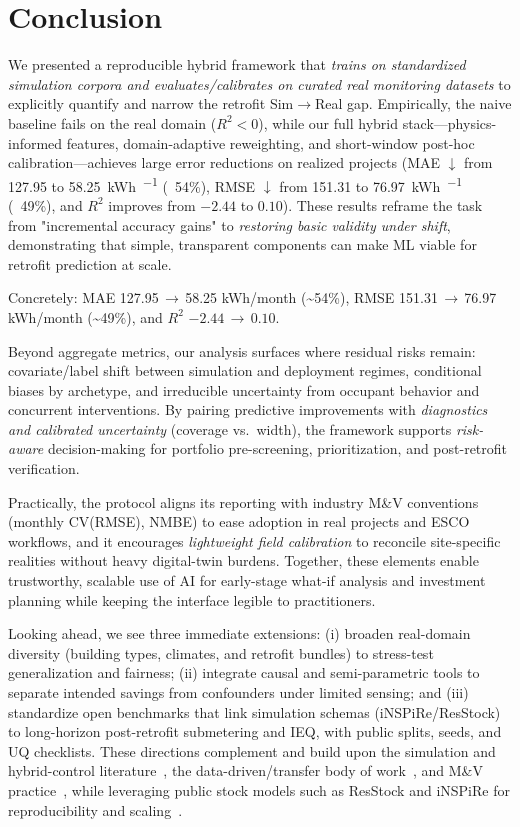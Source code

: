 ﻿\documentclass{article}
\begin{document}
\section{Conclusion}
We presented a reproducible hybrid framework that \emph{trains on standardized simulation corpora and evaluates/calibrates on curated real monitoring datasets} to explicitly quantify and narrow the retrofit Sim$\rightarrow$Real gap. Empirically, the naive baseline fails on the real domain ($R^2<0$), while our full hybrid stack---physics-informed features, domain-adaptive reweighting, and short-window post-hoc calibration---achieves large error reductions on realized projects (MAE $\downarrow$ from 127.95 to 58.25~\si{kWh\per\month} (~54\%), RMSE $\downarrow$ from 151.31 to 76.97~\si{kWh\per\month} (~49\%), and $R^2$ improves from $-2.44$ to $0.10$). These results reframe the task from "incremental accuracy gains" to \emph{restoring basic validity under shift}, demonstrating that simple, transparent components can make ML viable for retrofit prediction at scale.

Concretely: MAE 127.95\,$\rightarrow$\,58.25 kWh/month (\textasciitilde54\%), RMSE 151.31\,$\rightarrow$\,76.97 kWh/month (\textasciitilde49\%), and $R^2$ $-2.44\,\rightarrow\,0.10$.

Beyond aggregate metrics, our analysis surfaces where residual risks remain: covariate/label shift between simulation and deployment regimes, conditional biases by archetype, and irreducible uncertainty from occupant behavior and concurrent interventions. By pairing predictive improvements with \emph{diagnostics and calibrated uncertainty} (coverage vs.\ width), the framework supports \emph{risk-aware} decision-making for portfolio pre-screening, prioritization, and post-retrofit verification.

Practically, the protocol aligns its reporting with industry M\&V conventions (monthly CV(RMSE), NMBE) to ease adoption in real projects and ESCO workflows, and it encourages \emph{lightweight field calibration} to reconcile site-specific realities without heavy digital-twin burdens. Together, these elements enable trustworthy, scalable use of AI for early-stage what-if analysis and investment planning while keeping the interface legible to practitioners.

Looking ahead, we see three immediate extensions: (i) broaden real-domain diversity (building types, climates, and retrofit bundles) to stress-test generalization and fairness; (ii) integrate causal and semi-parametric tools to separate intended savings from confounders under limited sensing; and (iii) standardize open benchmarks that link simulation schemas (iNSPiRe/ResStock) to long-horizon post-retrofit submetering and IEQ, with public splits, seeds, and UQ checklists. These directions complement and build upon the simulation and hybrid-control literature~\citep{crawley2001energyplus,klein2017trnsys,wang2015modelica,drgona2020all,heinen2022flexibility}, the data-driven/transfer body of work~\citep{ahmad2017review,li2021review,hong2020transfer,mahnke2022transfer,li2022domain}, and M\&V practice~\citep{ashrae2014guideline,ipmvp2012}, while leveraging public stock models such as ResStock and iNSPiRe for reproducibility and scaling~\citep{resstock2017,wolf2014inspire}.
\end{document}
